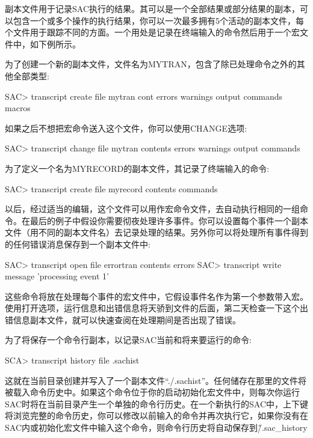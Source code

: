 副本文件用于记录SAC执行的结果。其可以是一个全部结果或部分结果的副本，可以包含一个或多个操作的执行结果，你可以一次最多拥有5个活动的副本文件，每个文件用于跟踪不同的方面。一个用处是记录在终端输入的命令然后用于一个宏文件中，如下例所示。

为了创建一个新的副本文件，文件名为MYTRAN，包含了除已处理命令之外的其他全部类型:
\begin{SACCode}
SAC> transcript create file mytran cont errors warnings output commands macros
\end{SACCode}

如果之后不想把宏命令送入这个文件，你可以使用CHANGE选项:
\begin{SACCode}
SAC> transcript change file mytran contents errors warnings output commands
\end{SACCode}

为了定义一个名为MYRECORD的副本文件，其记录了终端输入的命令:
\begin{SACCode}
SAC> transcript create file myrecord contents commands
\end{SACCode}

以后，经过适当的编辑，这个文件可以用作宏命令文件，去自动执行相同的一组命令。在最后的例子中假设你需要彻夜处理许多事件。你可以设置每个事件一个副本文件（用不同的副本文件名）去记录处理的结果。另外你可以将处理所有事件得到的任何错误消息保存到一个副本文件中:
\begin{SACCode}
SAC> transcript open file errortran contents errors
SAC> transcript write message 'processing event 1'
\end{SACCode}

这些命令将放在处理每个事件的宏文件中，它假设事件名作为第一个参数带入宏。使用打开选项，运行信息和出错信息将天骄到文件的后面，第二天检查一下这个出错信息副本文件，就可以快速查阅在处理期间是否出现了错误。

为了将保存一个命令行副本，以记录SAC当前和将来要运行的命令:
\begin{SACCode}
SCA> transcript history file .sachist
\end{SACCode}
这就在当前目录创建并写入了一个副本文件``./.sachist''。任何储存在那里的文件将被载入命令历史中。如果这个命令位于你的启动初始化宏文件中，则每次你运行SAC时将在当前目录产生一个单独的命令行历史。在一个新执行的SAC中，上下键将浏览完整的命令历史，你可以修改以前输入的命令并再次执行它，如果你没有在SAC内或初始化宏文件中输入这个命令，则命令行历史将自动保存到\~/.sac\_history
